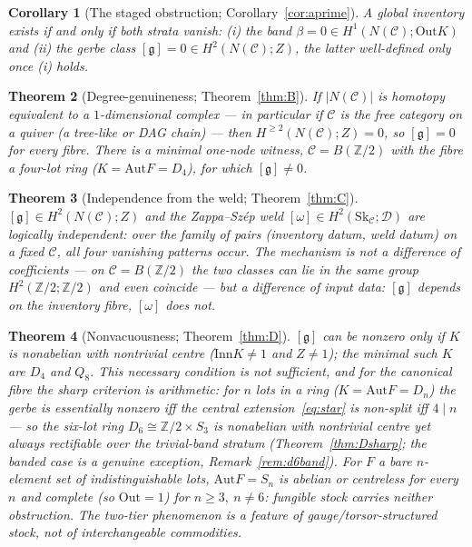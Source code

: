\documentclass[11pt]{article}
\newtheorem{theorem}{Theorem}
\newtheorem{corollary}[theorem]{Corollary}
\theoremstyle{definition}
\newcommand{\C}{\mathcal{C}}
\newcommand{\Sk}{\mathrm{Sk}}
\newcommand{\Z}{\mathbb{Z}}
\newcommand{\Aut}{\mathrm{Aut}}
\newcommand{\Inn}{\mathrm{Inn}}
\newcommand{\Out}{\mathrm{Out}}
\newcommand{\Zc}{Z}
\newcommand{\gerbe}{\mathfrak{g}}
\newcommand{\Dfr}{\mathcal{D}}
\begin{document}
\begin{corollary}[The staged obstruction; Corollary~\ref{cor:aprime}]
A global inventory exists if and only if \emph{both} strata vanish: \textup{(i)} the band
$\beta=0\in H^1(N(\C);\Out K)$ and \textup{(ii)} the gerbe class $[\gerbe]=0\in H^2(N(\C);\Zc)$,
the latter well-defined only once \textup{(i)} holds.
\end{corollary}

\begin{theorem}[Degree-genuineness; Theorem~\ref{thm:B}]
If $|N(\C)|$ is homotopy equivalent to a \emph{$1$-dimensional} complex --- in particular if $\C$
is the free category on a quiver (a tree-like or DAG chain) --- then $H^{\ge2}(N(\C);\Zc)=0$, so
$[\gerbe]=0$ for every fibre. There is a minimal one-node witness, $\C=B(\Z/2)$ with the fibre a
four-lot ring ($K=\Aut F=D_4$), for which $[\gerbe]\neq0$.
\end{theorem}

\begin{theorem}[Independence from the weld; Theorem~\ref{thm:C}]
$[\gerbe]\in H^2(N(\C);\Zc)$ and the Zappa--Sz\'ep weld $[\omega]\in H^2(\Sk_\C;\Dfr)$ are
logically independent: over the family of pairs (inventory datum, weld datum) on a fixed $\C$,
all four vanishing patterns occur. The mechanism is \emph{not} a difference of coefficients ---
on $\C=B(\Z/2)$ the two classes can lie in the same group $H^2(\Z/2;\Z/2)$ and even coincide ---
but a difference of \emph{input data}: $[\gerbe]$ depends on the inventory fibre, $[\omega]$ does
not.
\end{theorem}

\begin{theorem}[Nonvacuousness; Theorem~\ref{thm:D}]
$[\gerbe]$ can be nonzero only if $K$ is \emph{nonabelian with nontrivial centre}
($\Inn K\ne1$ and $\Zc\ne1$); the minimal such $K$ are $D_4$ and $Q_8$. This necessary condition is
\emph{not} sufficient, and for the canonical fibre the sharp criterion is arithmetic: for $n$ lots
in a ring ($K=\Aut F=D_n$) the gerbe is essentially nonzero iff the central extension~\eqref{eq:star}
is non-split iff $4\mid n$ --- so the six-lot ring $D_6\cong\Z/2\times S_3$ is nonabelian with
nontrivial centre yet always rectifiable over the trivial-band stratum (Theorem~\ref{thm:Dsharp};
the banded case is a genuine exception, Remark~\ref{rem:d6band}). For $F$ a bare
$n$-element set of indistinguishable lots, $\Aut F=S_n$ is abelian or centreless for every $n$
and complete (so $\Out=1$) for $n\ge3,\ n\ne6$: fungible stock carries \emph{neither} obstruction.
The two-tier phenomenon is a feature of gauge/torsor-structured stock, not of interchangeable
commodities.
\end{theorem}
\end{document}
